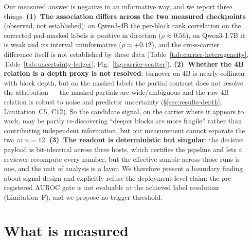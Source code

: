 \documentclass{article}
\begin{document}
Our measured answer is negative in an informative way, and we report three things.
\textbf{(1)~The association differs across the two measured checkpoints} (observed, not
established): on Qwen3-4B \citep{yang2025qwen3} the per-block rank correlation on the corrected
pad-masked labels is positive in direction ($\rho\approx0.56$), on Qwen3-1.7B it is weak and its
interval uninformative ($\rho\approx+0.12$), and the cross-carrier difference itself is not
established by these data (Table~\ref{tab:carrier-heterogeneity},
Table~\ref{tab:uncertainty-ledger}, Fig.~\ref{fig:carrier-scatter}). \textbf{(2)~Whether the 4B
relation is a depth proxy is not resolved}: turnover on 4B is nearly collinear with block depth,
but on the masked labels the partial contrast does not resolve the attribution --- the masked
partials are wide/ambiguous and the raw 4B relation is robust to noise and predictor uncertainty
(\S\ref{sec:results-depth}, Limitation~C5, C12). So the candidate signal, on the carrier where it
appears to work, may be partly re-discovering ``deeper blocks are more fragile'' rather than
contributing independent information, but our measurement cannot separate the two at $n{=}12$.
\textbf{(3)~The readout is deterministic but singular}: the decisive payload is bit-identical
across three hosts, which certifies the pipeline and lets a reviewer recompute every number, but
the effective sample across those runs is one, and the unit of analysis is a layer. We therefore
present a boundary finding about signal design and explicitly refuse the deployment-level claim:
the pre-registered AUROC gate is not evaluable at the achieved label resolution (Limitation~F),
and we propose no trigger threshold.

\section{What is measured}
\label{sec:method}
\end{document}

